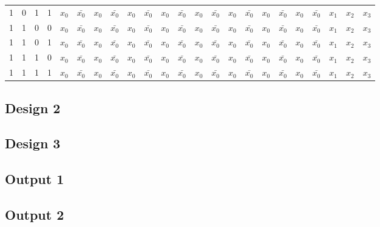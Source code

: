 \documentclass[12pt,openany,a4paper]{book}
\begin{document}
\begin{landscape}
\begin{table}[H]
\begin{tabular}{|cccc|ccccccccccccccccccc|}
    1     & 0     & 1     & 1     & $x_0$ & $\bar{x_0}$ & $x_0$ & $\bar{x_0}$ & $x_0$ & $\bar{x_0}$ & $x_0$ & $\bar{x_0}$ & $x_0$ & $\bar{x_0}$ & $x_0$ & $\bar{x_0}$ & $x_0$ & $\bar{x_0}$ & $x_0$ & $\bar{x_0}$ & $x_1$ & $x_2$ & $x_3$ \\
    1     & 1     & 0     & 0     & $x_0$ & $\bar{x_0}$ & $x_0$ & $\bar{x_0}$ & $x_0$ & $\bar{x_0}$ & $x_0$ & $\bar{x_0}$ & $x_0$ & $\bar{x_0}$ & $x_0$ & $\bar{x_0}$ & $x_0$ & $\bar{x_0}$ & $x_0$ & $\bar{x_0}$ & $x_1$ & $x_2$ & $x_3$ \\
    1     & 1     & 0     & 1     & $x_0$ & $\bar{x_0}$ & $x_0$ & $\bar{x_0}$ & $x_0$ & $\bar{x_0}$ & $x_0$ & $\bar{x_0}$ & $x_0$ & $\bar{x_0}$ & $x_0$ & $\bar{x_0}$ & $x_0$ & $\bar{x_0}$ & $x_0$ & $\bar{x_0}$ & $x_1$ & $x_2$ & $x_3$ \\
    1     & 1     & 1     & 0     & $x_0$ & $\bar{x_0}$ & $x_0$ & $\bar{x_0}$ & $x_0$ & $\bar{x_0}$ & $x_0$ & $\bar{x_0}$ & $x_0$ & $\bar{x_0}$ & $x_0$ & $\bar{x_0}$ & $x_0$ & $\bar{x_0}$ & $x_0$ & $\bar{x_0}$ & $x_1$ & $x_2$ & $x_3$ \\
    1     & 1     & 1     & 1     & $x_0$ & $\bar{x_0}$ & $x_0$ & $\bar{x_0}$ & $x_0$ & $\bar{x_0}$ & $x_0$ & $\bar{x_0}$ & $x_0$ & $\bar{x_0}$ & $x_0$ & $\bar{x_0}$ & $x_0$ & $\bar{x_0}$ & $x_0$ & $\bar{x_0}$ & $x_1$ & $x_2$ & $x_3$ \\
    \hline
    \end{tabular}%
  \label{tab:addlabel}%
\end{table}%

\end{landscape}


\subsection{Design 2}




\subsection{Design 3}




\subsection{Output 1}


\subsection{Output 2}
\end{document}
